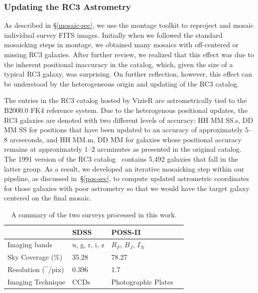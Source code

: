 \documentclass[authoryear, 12pt, 5p, times]{elsarticle}
\begin{document}
\subsubsection{Updating the RC3 Astrometry\label{sec:position}}

As described in \S\ref{mosaic-sec}, we use the montage toolkit to reproject and mosaic individual survey FITS images. Initially when we followed the standard mosaicking steps in montage, we obtained many mosaics with off-centered or missing RC3 galaxies. After further review, we realized that this effect was due to the inherent positional inaccuracy in the catalog, which, given the size of a typical RC3 galaxy, was surprising. On further reflection, however, this effect can be understood by the heterogeneous origin and updating of the RC3 catalog.

The entries in the RC3 catalog hosted by VizieR are astrometrically tied to the B2000.0 FK4 reference system. Due to the heterogenous positional updates, the RC3 galaxies are denoted with two different levels of accuracy: HH MM SS.s, DD MM SS for positions that have been updated  to an accuracy of approximately $5$--$8$ arcseconds, and  HH MM.m, DD MM for galaxies whose positional accuracy remains at approximately $1$--$2$ arcminutes as presented in the original catalog. The 1991 version of the RC3 catalog~\citep{rc31991} contains 5,492  galaxies that fall in the latter group. As a result, we developed an iterative mosaicking step within our pipeline, as discussed in~\S\ref{pos-sec}, to compute updated astrometric coordinates for those galaxies with poor astrometry so that we would have the target galaxy centered on the final mosaic.

\begin{table}
\footnotesize
    \begin{tabular}{llll}
    \hline
    ~                           & SDSS    & POSS-II             \\ \hline
    Imaging bands               & u, g, r, i, z  & $R_F$, $B_J$, $I_N$             \\
    Sky Coverage (\%)                & 35.28 & 78.27             \\
    Resolution ($^{\prime\prime}$/pix) & 0.396  & 1.7                 \\
    Imaging Technique           & CCDs    & Photographic Plates\\ \hline
    \end{tabular}
    \label{table:comptbl}
    \caption{{\footnotesize A summary of the two surveys processed in this work.}}
\end{table}
\end{document}
